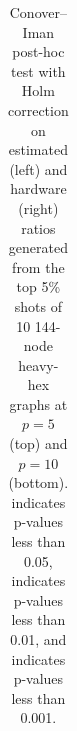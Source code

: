 \begin{table}[ht]
{\begin{tabular}{l|cccccccccccc|ccccccccccc|}
\end{tabular}
}
\caption{Conover–Iman post-hoc test with Holm correction on estimated (left) and hardware (right) ratios generated from the top 5\% shots of 10 144-node heavy-hex graphs at $p=5$ (top) and $p=10$ (bottom).  indicates p-values less than 0.05,  indicates p-values less than 0.01, and  indicates p-values less than 0.001.}
\label{tab:N144HH73_5_10_5pc_hw}
\end{table}